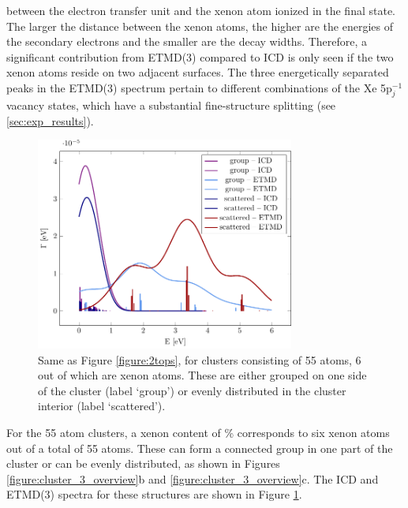 between the electron transfer unit and the xenon atom ionized in the final state.
The larger the distance between the xenon atoms, the higher are the energies
of the secondary electrons and the smaller are the decay widths. 
Therefore, a
significant contribution from ETMD(3) compared to ICD is only
seen if the two xenon atoms reside on two adjacent
surfaces. 
The three energetically separated peaks in the ETMD(3) spectrum pertain to different combinations of the Xe 5p$_j^{-1}$ vacancy states, which have a substantial fine-structure splitting (see \ref{sec:exp_results}).
%

\begin{figure}[ht]
 \centering
 \includegraphics[width=8.5cm]{pics/ar_3_6in.pdf}
 \caption{Same as Figure \protect\ref{figure:2tops}, for clusters consisting of
          55 atoms, 6 out of which are xenon atoms. These are either grouped
          on one side of the cluster (label `group') or evenly distributed
          in the cluster interior (label `scattered').}
 \label{figure:ar_3_6in}
\end{figure}
%
For the 55 atom clusters, a xenon content of \unit[10--12]{\%}
corresponds to six xenon atoms out of a total of 55 atoms. These can form a connected 
group in one part of the cluster or can be evenly distributed,
as shown in Figures \ref{figure:cluster_3_overview}b and \ref{figure:cluster_3_overview}c. The
ICD and ETMD(3) spectra for these structures are shown in Figure \ref{figure:ar_3_6in}.

